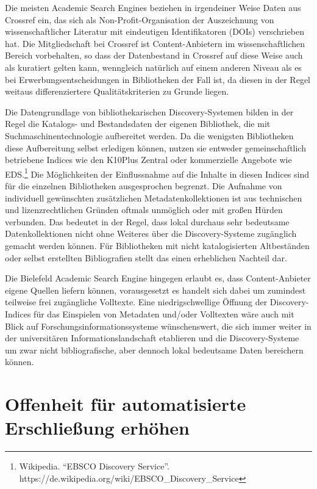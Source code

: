 \documentclass[a4paper,
fontsize=11pt,
oneside,
numbers=noperiodatend,
parskip=half-,
bibliography=totoc,
final
]{scrartcl}
\begin{document}
Die meisten Academic Search Engines beziehen in irgendeiner Weise Daten
aus Crossref ein, das sich als Non-Profit-Organisation der Auszeichnung
von wissenschaftlicher Literatur mit eindeutigen Identifikatoren (DOIs)
verschrieben hat. Die Mitgliedschaft bei Crossref ist Content-Anbietern
im wissenschaftlichen Bereich vorbehalten, so dass der Datenbestand in
Crossref auf diese Weise auch als kuratiert gelten kann, wenngleich
natürlich auf einem anderen Niveau als es bei Erwerbungsentscheidungen
in Bibliotheken der Fall ist, da diesen in der Regel weitaus
differenziertere Qualitätskriterien zu Grunde liegen.

Die Datengrundlage von bibliothekarischen Discovery-Systemen bilden in
der Regel die Katalogs- und Bestandsdaten der eigenen Bibliothek, die
mit Suchmaschinentechnologie aufbereitet werden. Da die wenigsten
Bibliotheken diese Aufbereitung selbst erledigen können, nutzen sie
entweder gemeinschaftlich betriebene Indices wie den K10Plus Zentral
oder kommerzielle Angebote wie EDS.\footnote{Wikipedia. \enquote{EBSCO
  Discovery Service}.
  https://de.wikipedia.org/wiki/EBSCO\_Discovery\_Service} Die
Möglichkeiten der Einflussnahme auf die Inhalte in diesen Indices sind
für die einzelnen Bibliotheken ausgesprochen begrenzt. Die Aufnahme von
individuell gewünschten zusätzlichen Metadatenkollektionen ist aus
technischen und lizenzrechtlichen Gründen oftmals unmöglich oder mit
großen Hürden verbunden. Das bedeutet in der Regel, dass lokal durchaus
sehr bedeutsame Datenkollektionen nicht ohne Weiteres über die
Discovery-Systeme zugänglich gemacht werden können. Für Bibliotheken mit
nicht katalogisierten Altbeständen oder selbst erstellten Bibliografien
stellt das einen erheblichen Nachteil dar.

Die Bielefeld Academic Search Engine hingegen erlaubt es, dass
Content-Anbieter eigene Quellen liefern können, vorausgesetzt es handelt
sich dabei um zumindest teilweise frei zugängliche Volltexte. Eine
niedrigschwellige Öffnung der Discovery-Indices für das Einspielen von
Metadaten und/oder Volltexten wäre auch mit Blick auf
Forschungsinformationssysteme wünschenswert, die sich immer weiter in
der universitären Informationslandschaft etablieren und die
Discovery-Systeme um zwar nicht bibliografische, aber dennoch lokal
bedeutsame Daten bereichern können.

\hypertarget{offenheit-fuxfcr-automatisierte-erschlieuxdfung-erhuxf6hen}{%
\section{Offenheit für automatisierte Erschließung
erhöhen}\label{offenheit-fuxfcr-automatisierte-erschlieuxdfung-erhuxf6hen}}
\end{document}

